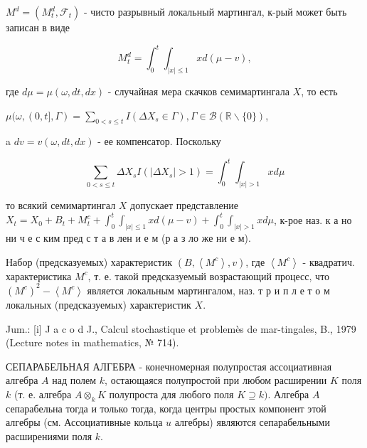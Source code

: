\documentclass[10pt]{article}
\begin{document}
$M^{d}=\left(M_{t}^{d}, \mathscr{F}_{t}\right)$ - чисто разрывный локальный мартингал, к-рый может быть записан в виде



\[

M_{t}^{d}=\int_{0}^{t} \int_{|x| \leqslant 1} x d(\mu-v),

\]



где $d \mu=\mu(\omega, d t, d x)$ - случайная мера скачков семимартингала $X$, то есть



$\mu(\omega,(0, t], \Gamma)=\sum_{0<s \leqslant t} I\left(\Delta X_{s} \in \Gamma\right), \Gamma \in \mathscr{B}(\mathbb{R} \backslash\{0\})$,



a $d v=v(\omega, d t, d x)$ - ее компенсатор. Поскольку



\[

\sum_{0<s \leqslant t} \Delta X_{s} I\left(\left|\Delta X_{s}\right|>1\right)=\int_{0}^{t} \int_{|x|>1} x d \mu

\]



то всякий семимартингал $X$ допускает представление $X_{t}=X_{0}+B_{t}+M_{t}^{c}+\int_{0}^{t} \int_{|x| \leqslant 1} x d(\mu-v)+\int_{0}^{t} \int_{|x|>1} x d \mu$, к-рое наз. к а но ни ч е с ким пред с т а в лен и е м (р а з ло же ни е м).



Набор (предсказуемых) характеристик $\left(B,\left\langle M^{c}\right\rangle, v\right)$, где $\left\langle M^{c}\right\rangle$ - квадратич. характеристика $M^{c}$, т. е. такой предсказуемый возрастающий процесс, что $\left(M^{c}\right)^{2}-\left\langle M^{c}\right\rangle$ является локальным мартингалом, наз. т р и п л е т о м локальных (предсказуемых) характеристик $X$.



Jum.: [i] J a c o d J., Calcul stochastique et problemès de mar-tingales, B., 1979 (Lecture notes in mathematics, № 714).



СЕПАРАБЕЛЬНАЯ АЛГЕБРА - конечномерная полупростая ассоциативная алгебра $A$ над полем $k$, остающаяся полупростой при любом расширении $K$ поля $k$ (т. е. алгебра $A \otimes_{k} K$ полупроста для любого поля $K \supseteq k)$. Алгебра $A$ сепарабельна тогда и только тогда, когда центры простых компонент этой алгебры (см. Ассоциативные кольца $u$ алгебры) являются сепарабельными расширениями поля $k$.
\end{document}
